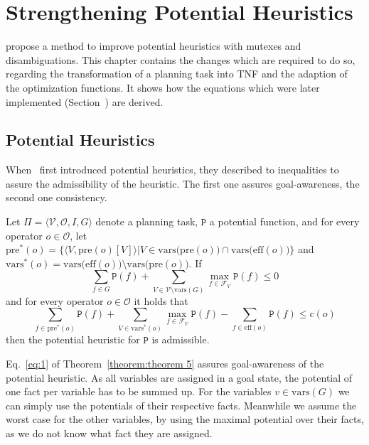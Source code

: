 
\chapter{Strengthening Potential Heuristics}\label{ch:strengthening-potential-heuristics}
\cite{fivser2020strengthening} propose a method to improve potential heuristics with mutexes and disambiguations.
This chapter contains the changes which are required to do so, regarding the transformation of a planning task into TNF and the adaption of the optimization functions.
It shows how the equations which were later implemented (Section~) are derived.

\section{Potential Heuristics}\label{sec:potential-heuristics}

When~\cite{pommerening2015non} first introduced potential heuristics, they described to inequalities to assure the admissibility of the heuristic.
The first one assures goal-awareness, the second one consistency.

\begin{theorem}
    \label{theorem:theorem 5} %
    Let $\Pi = \langle \mathcal{V}, \mathcal{O}, I, G \rangle$ denote a planning task, $\mathtt{P}$ a
    potential function, and for every operator $o\in\mathcal{O}$, let
    $\mathrm{pre}^*(o)=\{\langle V, \mathrm{pre}(o)[V]\rangle |V\in \mathrm{vars(pre}(o))\cap\mathrm{vars(eff}(o))\}$ and
    $\mathrm{vars}^*(o)=\mathrm{vars(eff}(o))\setminus\mathrm{vars(pre}(o))$. If
    \begin{equation}\sum_{f\in G}\mathtt{P}(f)+\sum_{V\in\mathcal{V}\setminus\mathrm{vars}(G)}\max_{f\in\mathcal{F}_V}\mathtt{P}(f)\leq0\label{eq:1}\end{equation}
    and for every operator $o\in\mathcal{O}$ it holds that
    \begin{equation}\sum_{f\in\mathrm{pre}^*(o)}\mathtt{P}(f)+\sum_{V\in\mathrm{vars}^*(o)}\max_{f\in\mathcal{F}_V}\mathtt{P}(f)-\sum_{f\in\mathrm{eff}(o)}\mathtt{P}(f)\leq c(o)\label{eq:2}\end{equation}
    then the potential heuristic for $\mathtt{P}$ is admissible.
\end{theorem}

Eq.~\eqref{eq:1} of Theorem~\ref{theorem:theorem 5} assures goal-awareness of the potential heuristic.
As all variables are assigned in a goal state, the potential of one fact per variable has to be summed up.
For the variables $v\in\text{vars}(G)$ we can simply use the potentials of their respective facts.
Meanwhile we assume the worst case for the other variables, by using the maximal potential over their facts, as we do not know what fact they are assigned.

